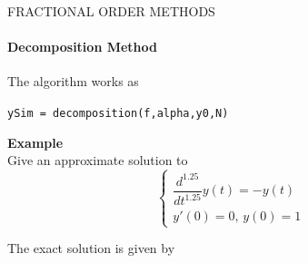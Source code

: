 \begin{frame}{FRACTIONAL ORDER METHODS}
\framesubtitle{Decomposition Method}
The algorithm works as
\begin{center}
    \texttt{ySim = decomposition(f,alpha,y0,N)}
\end{center}
    \textbf{Example}\\\vspace{0.5cm}
Give an approximate solution to
\begin{equation}
    \begin{cases}
        \dfrac{d^{1.25}}{dt^{1.25}}y(t)=-y(t)&\\
        y'(0)=0,\,y(0)=1
    \end{cases}
\end{equation}

\begin{multicols}{2}
\null \vfill
The exact solution is given by


\end{multicols}
\end{frame}
